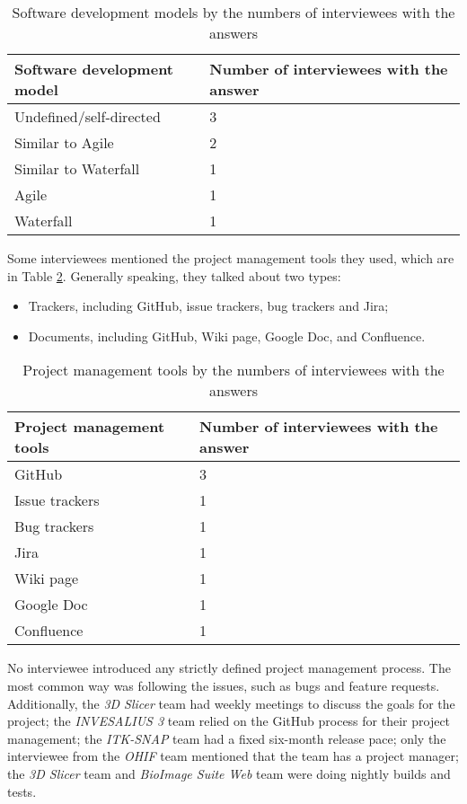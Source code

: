 \begin{table}[H]
\centering
\begin{tabular}{ll}
\hline
Software development model & Number of interviewees with the answer \\ \hline
Undefined/self-directed & 3 \\
Similar to Agile & 2 \\
Similar to Waterfall & 1 \\
Agile & 1 \\
Waterfall & 1 \\ \hline
\end{tabular}
\caption{\label{tab_developmen_models}Software development models by the numbers of interviewees with the answers}
\end{table}

Some interviewees mentioned the project management tools they used, which are in Table \ref{tab_pm_tools}. Generally speaking, they talked about two types:

\begin{itemize}
\item Trackers, including GitHub, issue trackers, bug trackers and Jira;
\item Documents, including GitHub, Wiki page, Google Doc, and Confluence.
\end{itemize}

\begin{table}[H]
\centering
\begin{tabular}{ll}
\hline
Project management tools & Number of interviewees with the answer \\ \hline
GitHub & 3 \\
Issue trackers & 1 \\
Bug trackers & 1 \\
Jira & 1 \\
Wiki page & 1 \\
Google Doc & 1 \\
Confluence & 1 \\ \hline
\end{tabular}
\caption{\label{tab_pm_tools}Project management tools by the numbers of interviewees with the answers}
\end{table}

No interviewee introduced any strictly defined project management process. The most common way was following the issues, such as bugs and feature requests. Additionally, the \textit{3D Slicer} team had weekly meetings to discuss the goals for the project; the \textit{INVESALIUS 3} team relied on the GitHub process for their project management; the \textit{ITK-SNAP} team had a fixed six-month release pace; only the interviewee from the \textit{OHIF} team mentioned that the team has a project manager; the \textit{3D Slicer} team and \textit{BioImage Suite Web} team were doing nightly builds and tests.


